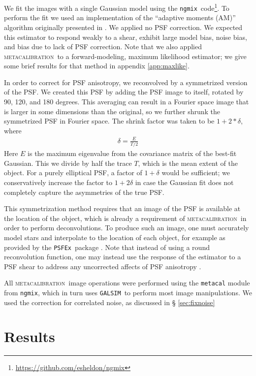 \documentclass[iop]{emulateapj}
\newcommand{\mcal}{\textsc{metacalibration}}
\newcommand{\psfex}{\texttt{PSFEx}}
\newcommand{\ngmix}{\texttt{ngmix}}
\newcommand{\galsim}{\texttt{GALSIM}}
\begin{document}
We fit the images with a single Gaussian model using the \ngmix\
code\footnote{\url{https://github.com/esheldon/ngmix}}.  To perform the fit we
used an implementation of the ``adaptive moments (AM)'' algorithm originally
presented in \cite{bj02}.   We applied no PSF correction.  We expected this
estimator to respond weakly to a shear, exhibit large model bias, noise bias,
and bias due to lack of PSF correction.  Note that we also applied \mcal\ to a
forward-modeling, maximum likelihood estimator; we give some brief results for
that method in appendix \ref{app:maxlike}.

In order to correct for PSF anisotropy, we reconvolved by a symmetrized version
of the PSF. We created this PSF by adding the PSF image to itself, rotated by
90, 120, and 180 degrees.  This averaging can result in a Fourier space image
that is larger in some dimensions than the original, so we further shrunk
the symmetrized PSF in Fourier space.  The shrink factor was taken to be
$1+2*\delta$, where
\begin{align}
    \delta = \frac{E}{T/2}
\end{align}
Here $E$ is the maximum eigenvalue from the covariance matrix of the best-fit
Gaussian. This we divide by half the trace $T$, which is the mean extent of the
object.  For a purely elliptical PSF, a factor of $1+\delta$ would be
sufficient; we conservatively increase the factor to $1+2\delta$ in case the
Gaussian fit does not completely capture the asymmetries of the true PSF.

This symmetrization method requires that an image of the PSF is available at
the location of the object, which is already a requirement of \mcal\ in order
to perform deconvolutions.  To produce such an image, one must accurately model
stars and interpolate to the location of each object, for example as provided
by the \psfex\ package \citep{BertinPSFEx2011}.  Note that instead of using a
round reconvolution function, one may instead use the response of the estimator
to a PSF shear to address any uncorrected affects of PSF anisotropy
\citep{HuffMcal}.

All \mcal\ image operations were performed using the \texttt{metacal} module
from \ngmix, which in turn uses \galsim\ to perform most image manipulations.
We used the correction for correlated noise, as discussed in \S
\ref{sec:fixnoise}


\section{Results} \label{sec:results}
\end{document}
